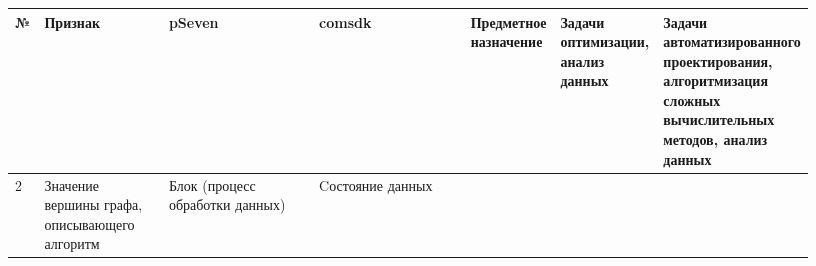 \begin{landscape}
\begin{longtable}{|p{0.03\linewidth}|p{0.2\linewidth}|p{0.35\linewidth}|p{0.35\linewidth}|}
        \textbf{№} & \textbf{Признак}                                                                           & \textbf{pSeven}                                                                                                                                                                                                                                                                                                                                                                                                                                                                                                                                                                                                                                                    & \textbf{comsdk}                                                                                                                                                                                                                                                                   \endhead
{}          & Предметное назначение                                                                      & Задачи оптимизации, анализ данных                                                                                                                                                                                                                                                                                                                                                                                                                                                                                                                                                                                                                                  & Задачи автоматизированного проектирования, алгоритмизация сложных вычислительных методов, анализ данных                                                                                                                                                                                          \\
                  & Значение вершины графа, описывающего алгоритм                                              & Блок (процесс обработки данных)                                                                                                                                                                                                                                                                                                                                                                                                                                                                                                                                                                                                                                    & Cостояние данных                                                                                                                                                                                                                                                                                 \\

\end{longtable}
\end{landscape}
